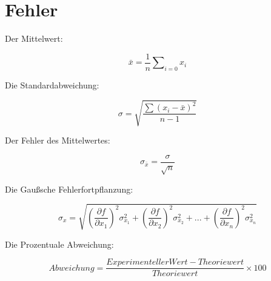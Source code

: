 \section{Fehler}
\label{sec:Fehler}
Der Mittelwert:
\begin{center}
  \begin{equation}
    \label{eq:Mittelwert}
  \bar{x} = \frac{1}{n} \sum \nolimits_{i=0} x_i
  \end{equation} 
\end{center}

Die Standardabweichung:
\begin{center}
  \begin{equation}
    \label{eq:standardabweichung}
    \sigma=\sqrt{\frac{\sum(x_i-\bar{x})^2}{n-1}}
  \end{equation}
\end{center}

Der Fehler des Mittelwertes:
\begin{center}
  \begin{equation}
    \label{eq:mittelwertfehler}
    \sigma_{\bar{x}}=\frac{\sigma}{\sqrt{n}}
  \end{equation}

  
\end{center}


Die Gaußsche Fehlerfortpflanzung:
\begin{center}
\begin{equation}
  \label{eq:gaussfehler}  
\sigma_x=\sqrt{(\frac{\partial f}{\partial x_1})^2\sigma_{x_1}^2+(\frac{\partial f}{\partial x_2})^2\sigma_{x_2}^2+...+(\frac{\partial f}{\partial x_n})^2\sigma_{x_n}^2}
\end{equation}
\end{center}

Die Prozentuale Abweichung:

\begin{center}
  \begin{equation}
    \label{eq:prozentuale} 
    Abweichung=\frac{Experimenteller Wert - Theoriewert}{Theoriewert}\times 100 
   \end{equation}
  \end{center}